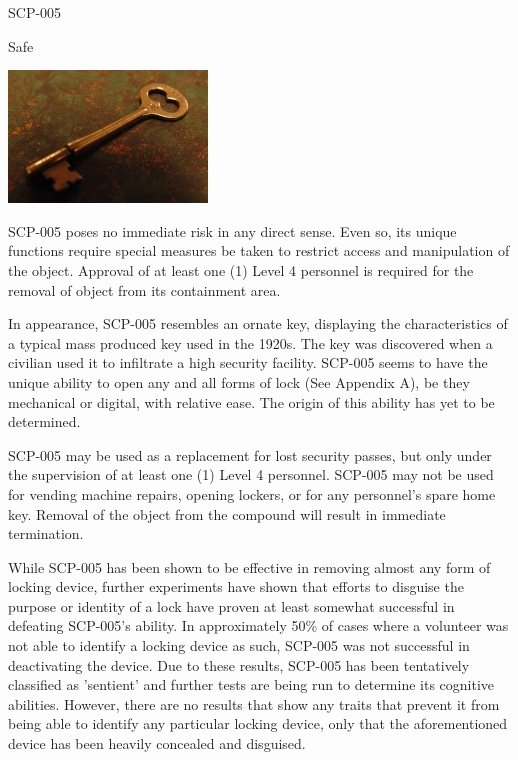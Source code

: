  SCP-005

 Safe

\begin{center}
\includegraphics[scale=1]{scp/005.jpg}
\end{center}

 SCP-005 poses no immediate risk in any direct sense. Even so, its unique functions require special measures be taken to restrict access and manipulation of the object. Approval of at least one (1) Level 4 personnel is required for the removal of object from its containment area.

 In appearance, SCP-005 resembles an ornate key, displaying the characteristics of a typical mass produced key used in the 1920s. The key was discovered when a civilian used it to infiltrate a high security facility. SCP-005 seems to have the unique ability to open any and all forms of lock (See Appendix A), be they mechanical or digital, with relative ease. The origin of this ability has yet to be determined.

 SCP-005 may be used as a replacement for lost security passes, but only under the supervision of at least one (1) Level 4 personnel. SCP-005 may not be used for vending machine repairs, opening lockers, or for any personnel's spare home key. Removal of the object from the compound will result in immediate termination.

 While SCP-005 has been shown to be effective in removing almost any form of locking device, further experiments have shown that efforts to disguise the purpose or identity of a lock have proven at least somewhat successful in defeating SCP-005's ability. In approximately 50\% of cases where a volunteer was not able to identify a locking device as such, SCP-005 was not successful in deactivating the device. Due to these results, SCP-005 has been tentatively classified as 'sentient' and further tests are being run to determine its cognitive abilities. However, there are no results that show any traits that prevent it from being able to identify any particular locking device, only that the aforementioned device has been heavily concealed and disguised.